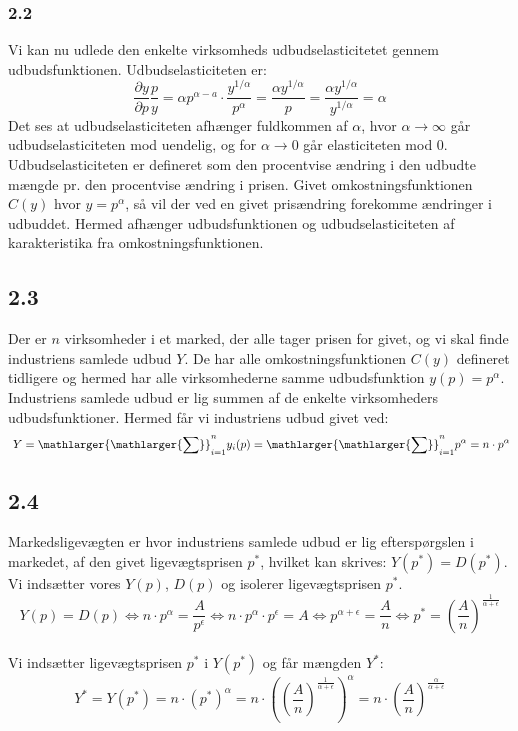 \documentclass[a4paper, 12pt]{article}
\begin{document}
\subsubsection*{2.2}
Vi kan nu udlede den enkelte virksomheds udbudselasticitetet gennem udbudsfunktionen. Udbudselasticiteten er:
$$\dfrac{\partial y}{\partial p} \dfrac{p}{y} = \alpha p^{\alpha - a} \cdot \dfrac{y^{1/ \alpha}}{p^{\alpha}} = \dfrac{\alpha y^{1/ \alpha}}{p} = \dfrac{\alpha y^{1/ \alpha}}{y^{1/ \alpha}} = \alpha$$
Det ses at udbudselasticiteten afhænger fuldkommen af $\alpha$, hvor $\alpha \rightarrow \infty $ går udbudselasticiteten mod uendelig, og for $\alpha \rightarrow 0$ går elasticiteten mod 0.
\\
Udbudselasticiteten er defineret som den procentvise ændring i den udbudte mængde pr. den procentvise ændring i prisen. Givet omkostningsfunktionen $C(y)$ hvor $y=p^{\alpha}$, så vil der ved en givet prisændring forekomme ændringer i udbuddet. Hermed afhænger udbudsfunktionen og udbudselasticiteten af karakteristika fra omkostningsfunktionen.

\subsection*{2.3}
Der er $n$ virksomheder i et marked, der alle tager prisen for givet, og vi skal finde industriens samlede udbud $Y$. De har alle omkostningsfunktionen $C(y)$ defineret tidligere og hermed har alle virksomhederne samme udbudsfunktion $y(p) = p^{\alpha}$. Industriens samlede udbud er lig summen af de enkelte virksomheders udbudsfunktioner. Hermed får vi industriens udbud givet ved:
\begin{equation}
\ Y = \mathlarger{\mathlarger{\sum}}_{i = 1}^{n} y_{i}(p) = \mathlarger{\mathlarger{\sum}}_{i = 1}^{n} p^{\alpha} = n\cdot p^{\alpha}
\end{equation}

\subsection*{2.4}
Markedsligevægten er hvor industriens samlede udbud er lig efterspørgslen i markedet, af den givet ligevægtsprisen $p^{*}$, hvilket kan skrives: $Y(p^{*}) = D(p^{*})$. Vi indsætter vores $Y(p)$, $D(p)$ og isolerer ligevægtsprisen $p^{*}$.
$$Y(p) = D(p) \Leftrightarrow n\cdot p^{\alpha} = \frac{A}{p^{\epsilon}} \Leftrightarrow n\cdot p^{\alpha} \cdot p^{\epsilon} = A \Leftrightarrow p^{\alpha + \epsilon} = \frac{A}{n} \Leftrightarrow p^{*} = \left( \frac{A}{n} \right)^{\frac{1}{\alpha + \epsilon}}$$
\\
Vi indsætter ligevægtsprisen $p^{*}$ i $Y(p^{*})$ og får mængden $Y^{*}$:
$$Y^{*} = Y(p^{*}) = n \cdot (p^{*})^{\alpha} = n \cdot \left( \left( \frac{A}{n} \right)^{\frac{1}{\alpha + \epsilon}} \right)^{\alpha} = n\cdot \left( \frac{A}{n} \right)^{\frac{\alpha}{\alpha + \epsilon}}$$
\end{document}
